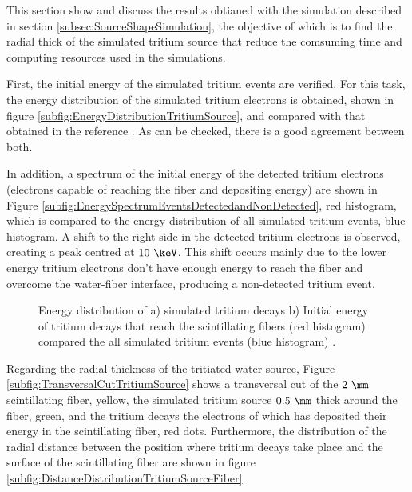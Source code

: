 This section show and discuss the results obtianed with the simulation described in section \ref{subsec:SourceShapeSimulation}, the objective of which is to find the radial thick of the simulated tritium source that reduce the comsuming time and computing resources used in the simulations. 

First, the initial energy of the simulated tritium events are verified. For this task, the energy distribution of the simulated tritium electrons is obtained, shown in figure \ref{subfig:EnergyDistributionTritiumSource}, and compared with that obtained in the reference \cite{TritiumEmissionSpectrum}. As can be checked, there is a good agreement between both.

In addition, a spectrum of the initial energy of the detected tritium electrons (electrons capable of reaching the fiber and depositing energy) are shown in Figure \ref{subfig:EnergySpectrumEventsDetectedandNonDetected}, red histogram, which is compared to the energy distribution of all simulated tritium events, blue histogram. A shift to the right side in the detected tritium electrons is observed, creating a peak centred at $10~\keV$. This shift occurs mainly due to the lower energy tritium electrons don't have enough energy to reach the fiber and overcome the water-fiber interface, producing a non-detected tritium event.

\begin{figure}[h]
 \centering
 \caption{ Energy distribution of a) simulated tritium decays b) Initial energy of tritium decays that reach the scintillating fibers (red histogram) compared the all simulated tritium events (blue histogram) \cite{SimulationPaperCarlos}.
 \label{fig:TritiumSourceOptimization}}
\end{figure}

Regarding the radial thickness of the tritiated water source, Figure \ref{subfig:TransversalCutTritiumSource} shows a transversal cut of the $2~\mm$ scintillating fiber, yellow, the simulated tritium source $0.5~\mm$ thick around the fiber, green, and the tritium decays the electrons of which has deposited their energy in the scintillating fiber, red dots. Furthermore, the distribution of the radial distance between the position where tritium decays take place and the surface of the scintillating fiber are shown in figure \ref{subfig:DistanceDistributionTritiumSourceFiber}.

